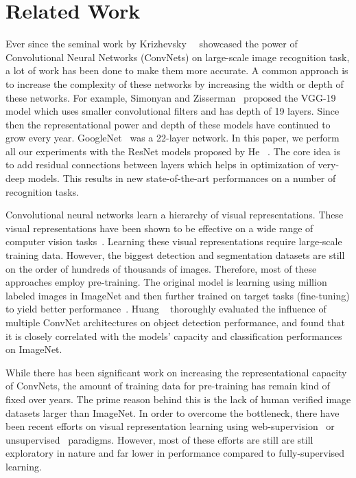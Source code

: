 \documentclass[10pt,twocolumn,letterpaper]{article}
\begin{document}
\section{Related Work}
Ever since the seminal work by Krizhevsky~\etal~\cite{AlexNet} showcased the power of Convolutional Neural Networks (ConvNets) on large-scale image recognition task, a lot of work has been done to make them more accurate. A common approach is to increase the complexity of these networks by increasing the width or depth of these networks. For example, Simonyan and Zisserman~\cite{Simonyan14VGG} proposed the VGG-19 model which uses smaller convolutional filters and has depth of 19 layers. Since then the representational power and depth of these models have continued to grow every year. GoogleNet~\cite{GoogleNet} was a 22-layer network. In this paper, we perform all our experiments with the ResNet models proposed by He \etal~\cite{he2016resnet}. The core idea is to add residual connections between layers which helps in optimization of very-deep models. This results in new state-of-the-art performances on a number of recognition tasks.

Convolutional neural networks  learn a hierarchy of visual representations. These visual representations have been shown to be effective on a wide range of computer vision tasks~\cite{chen2016deeplab,FasterRCNN,RCNN,papandreou2017towards,DBLP:journals/corr/SimonyanZ14,DBLP:journals/corr/AgrawalGM14a,jain201515}. Learning these visual representations require large-scale training data. However, the biggest detection and segmentation datasets are still on the order of hundreds of thousands of images. Therefore, most of these approaches employ pre-training. The original model is learning using million labeled images in ImageNet and then further trained on  target tasks (fine-tuning) to yield better performance~\cite{RCNN, FasterRCNN, chen2016deeplab}. Huang \etal~\cite{Google_FRCNN} thoroughly evaluated the influence of multiple ConvNet architectures on object detection performance, and found that it is closely correlated with the models' capacity and classification performances on ImageNet.

While there has been significant work on increasing the representational capacity of ConvNets, the amount of training data for pre-training has remain kind of fixed over years. The prime reason behind this is the lack of human verified image datasets larger than ImageNet. In order to overcome the bottleneck, there have been recent efforts on visual representation learning using web-supervision~\cite{chen2015webly,chen2013neil,levan,DBLP:conf/mm/IzadiniaRFHH15,NIPS2010_0093,JoulinWeakly,DBLP:journals/corr/NiPBEBCW15,DBLP:journals/corr/KrauseSHZTDPL15} 
or unsupervised~\cite{Rubinstein13Unsupervised,doersch2015unsupervised,DBLP:journals/corr/DonahueKD16,DBLP:journals/corr/WangG15a,DBLP:journals/corr/PintoGHPG16,DBLP:journals/corr/PintoG15,DBLP:conf/nips/VondrickPT16} paradigms. However, most of these efforts are still are still exploratory in nature and far lower in performance compared to fully-supervised learning.
\end{document}
